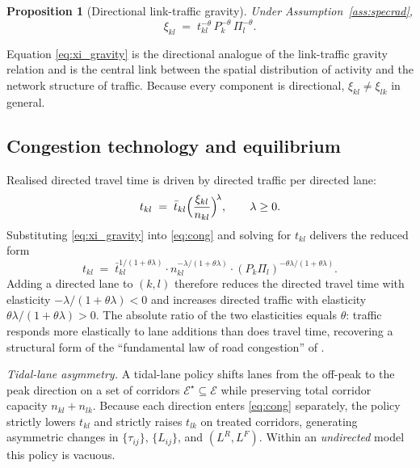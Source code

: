 \documentclass[12pt]{article}
\newtheorem{proposition}{Proposition}
\newcommand{\E}{\mathcal E}
\newcommand{\tbar}{\bar t}
\newcommand{\tkl}{t_{kl}}
\newcommand{\tijk}{\tau_{ij}}
\begin{document}
\begin{proposition}[Directional link-traffic gravity]\label{prop:linkgravity}
Under Assumption~\ref{ass:specrad},
\begin{equation}
  \xi_{kl}\;=\;\tkl^{-\theta}\,P_k^{-\theta}\,\Pi_l^{-\theta}.
  \label{eq:xi_gravity}
\end{equation}
\end{proposition}

Equation \eqref{eq:xi_gravity} is the directional analogue of the
link-traffic gravity relation and is the central link between the
spatial distribution of activity and the network structure of
traffic.  Because every component is directional, $\xi_{kl}\ne\xi_{lk}$
in general.

\subsection{Congestion technology and equilibrium}\label{ssec:cong}

Realised directed travel time is driven by directed traffic per
directed lane:
\begin{equation}
  \tkl\;=\;\tbar_{kl}\Bigl(\frac{\xi_{kl}}{n_{kl}}\Bigr)^{\!\lambda},
  \qquad \lambda\ge 0.
  \label{eq:cong}
\end{equation}
Substituting \eqref{eq:xi_gravity} into \eqref{eq:cong} and solving
for $\tkl$ delivers the reduced form
\begin{equation}
  \tkl
  \;=\;
  \tbar_{kl}^{1/(1+\theta\lambda)}\cdot
  n_{kl}^{-\lambda/(1+\theta\lambda)}\cdot
  (P_k\Pi_l)^{-\theta\lambda/(1+\theta\lambda)}.
  \label{eq:tkl_reduced}
\end{equation}
Adding a directed lane to $(k,l)$ therefore reduces the directed
travel time with elasticity $-\lambda/(1+\theta\lambda)<0$ and
increases directed traffic with elasticity $\theta\lambda/
(1+\theta\lambda)>0$.  The absolute ratio of the two elasticities
equals $\theta$: traffic responds more elastically to lane additions
than does travel time, recovering a structural form of the
``fundamental law of road congestion'' of
\citet{DurantonTurner2011}.

\emph{Tidal-lane asymmetry.}  A tidal-lane policy shifts lanes from
the off-peak to the peak direction on a set of corridors
$\E^\star\subseteq\E$ while preserving total corridor capacity
$n_{kl}+n_{lk}$.  Because each direction enters \eqref{eq:cong}
separately, the policy strictly lowers $\tkl$ and strictly raises
$t_{lk}$ on treated corridors, generating asymmetric changes in
$\{\tijk\}$, $\{L_{ij}\}$, and $(L^R,L^F)$.  Within an \emph{undirected}
model this policy is vacuous.
\end{document}
